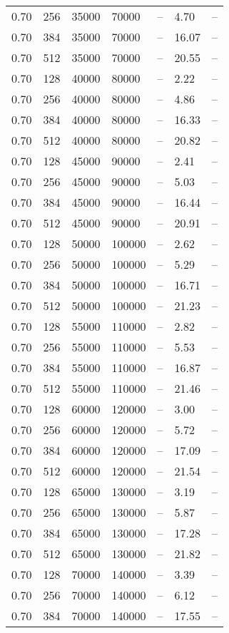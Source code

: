 \begin{tabular}{l|l|l|l|l|l|l}
0.70 & 256 &  35000 &  70000 & -- &  4.70 & --\\
0.70 & 384 &  35000 &  70000 & -- & 16.07 & --\\
0.70 & 512 &  35000 &  70000 & -- & 20.55 & --\\
0.70 & 128 &  40000 &  80000 & -- &  2.22 & --\\
0.70 & 256 &  40000 &  80000 & -- &  4.86 & --\\
0.70 & 384 &  40000 &  80000 & -- & 16.33 & --\\
0.70 & 512 &  40000 &  80000 & -- & 20.82 & --\\
0.70 & 128 &  45000 &  90000 & -- &  2.41 & --\\
0.70 & 256 &  45000 &  90000 & -- &  5.03 & --\\
0.70 & 384 &  45000 &  90000 & -- & 16.44 & --\\
0.70 & 512 &  45000 &  90000 & -- & 20.91 & --\\
0.70 & 128 &  50000 & 100000 & -- &  2.62 & --\\
0.70 & 256 &  50000 & 100000 & -- &  5.29 & --\\
0.70 & 384 &  50000 & 100000 & -- & 16.71 & --\\
0.70 & 512 &  50000 & 100000 & -- & 21.23 & --\\
0.70 & 128 &  55000 & 110000 & -- &  2.82 & --\\
0.70 & 256 &  55000 & 110000 & -- &  5.53 & --\\
0.70 & 384 &  55000 & 110000 & -- & 16.87 & --\\
0.70 & 512 &  55000 & 110000 & -- & 21.46 & --\\
0.70 & 128 &  60000 & 120000 & -- &  3.00 & --\\
0.70 & 256 &  60000 & 120000 & -- &  5.72 & --\\
0.70 & 384 &  60000 & 120000 & -- & 17.09 & --\\
0.70 & 512 &  60000 & 120000 & -- & 21.54 & --\\
0.70 & 128 &  65000 & 130000 & -- &  3.19 & --\\
0.70 & 256 &  65000 & 130000 & -- &  5.87 & --\\
0.70 & 384 &  65000 & 130000 & -- & 17.28 & --\\
0.70 & 512 &  65000 & 130000 & -- & 21.82 & --\\
0.70 & 128 &  70000 & 140000 & -- &  3.39 & --\\
0.70 & 256 &  70000 & 140000 & -- &  6.12 & --\\
0.70 & 384 &  70000 & 140000 & -- & 17.55 & --\\

\end{tabular}
